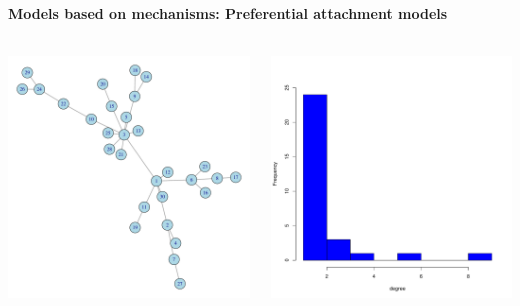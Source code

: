 \documentclass[8pt]{beamer}
\begin{document}
\begin{frame}
\frametitle{\insertsection}
\framesubtitle{Models based on mechanisms: Preferential attachment models}

\begin{columns}
\centering
\includegraphics[width=\textwidth]{barabasi1}

\centering 
\includegraphics[width=\textwidth]{barabasi2}

\end{columns}

\end{frame}
\end{document}
